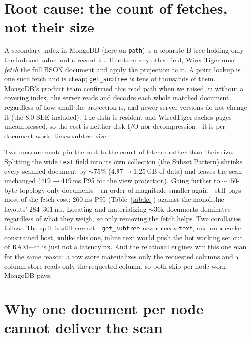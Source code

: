 \documentclass[11pt]{article}
\newcommand{\code}[1]{\texttt{#1}}
\begin{document}
\section{Root cause: the count of fetches, not their size}

A secondary index in MongoDB (here on \code{path}) is a separate B-tree holding
only the indexed value and a record id. To return any other field, WiredTiger
must \emph{fetch} the full BSON document and apply the projection to it. A point
lookup is one such fetch and is cheap; \code{get\_subtree} is tens of thousands
of them. MongoDB's product team confirmed this read path when we raised it:
without a covering index, the server reads and decodes each whole matched
document regardless of how small the projection is, and newer server versions do
not change it (the 8.0 SBE included). The data is resident and WiredTiger caches
pages uncompressed, so the cost is neither disk I/O nor decompression---it is
per-document work, times subtree size.

Two measurements pin the cost to the count of fetches rather than their size.
Splitting the wide \code{text} field into its own collection (the Subset
Pattern) shrinks every scanned document by ${\sim}75\%$
($4.97\to1.25$\,GB of data) and leaves the scan unchanged ($419\to419$\,ms P95
for the view projection). Going further to ${\sim}150$-byte topology-only
documents---an order of magnitude smaller again---still pays most of the fetch
cost: $260$\,ms P95 (Table~\ref{tab:kv}) against the monolithic layouts'
$284$--$301$\,ms. Locating and
materializing ${\sim}36$k documents dominates regardless of what they weigh, so
only removing the fetch helps. Two corollaries follow. The split is still
correct---\code{get\_subtree} never needs \code{text}, and on a
cache-constrained host, unlike this one, inline text would push the hot working
set out of RAM---it is just not a latency fix. And the relational engines win
this one scan for the same reason: a row store materializes only the requested
columns and a column store reads only the requested column, so both skip
per-node work MongoDB pays.

\section{Why one document per node cannot deliver the scan}\label{sec:mono}
\end{document}
